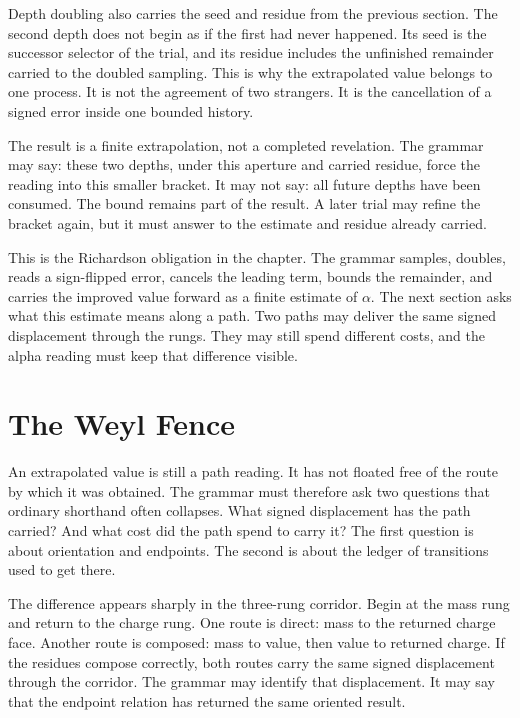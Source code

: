 Depth doubling also carries the seed and residue from the previous section.
The second depth does not begin as if the first had never happened. Its seed
is the successor selector of the trial, and its residue includes the
unfinished remainder carried to the doubled sampling. This is why the
extrapolated value belongs to one process. It is not the agreement of two
strangers. It is the cancellation of a signed error inside one bounded
history.

The result is a finite extrapolation, not a completed revelation. The
grammar may say: these two depths, under this aperture and carried residue,
force the reading into this smaller bracket. It may not say: all future
depths have been consumed. The bound remains part of the result. A later
trial may refine the bracket again, but it must answer to the estimate and
residue already carried.

This is the Richardson obligation in the chapter. The grammar samples,
doubles, reads a sign-flipped error, cancels the leading term, bounds the
remainder, and carries the improved value forward as a finite estimate of
\(\alpha\). The next section asks what this estimate means along a path.
Two paths may deliver the same signed displacement through the rungs. They
may still spend different costs, and the alpha reading must keep that
difference visible.

\section{The Weyl Fence}

An extrapolated value is still a path reading. It has not floated free of the
route by which it was obtained. The grammar must therefore ask two questions
that ordinary shorthand often collapses. What signed displacement has the path
carried? And what cost did the path spend to carry it? The first question is
about orientation and endpoints. The second is about the ledger of transitions
used to get there.

The difference appears sharply in the three-rung corridor. Begin at the mass
rung and return to the charge rung. One route is direct: mass to the returned
charge face. Another route is composed: mass to value, then value to returned
charge. If the residues compose correctly, both routes carry the same signed
displacement through the corridor. The grammar may identify that displacement.
It may say that the endpoint relation has returned the same oriented result.

